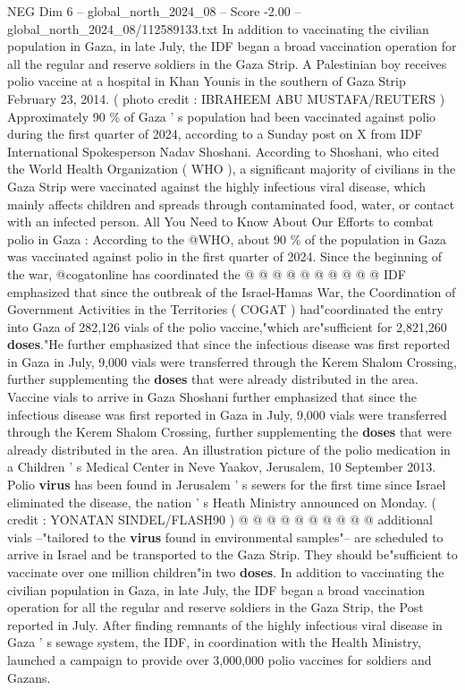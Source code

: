 \begin{textsample}{NEG Dim 6 – global\_north\_2024\_08 – Score -2.00 – global\_north\_2024\_08/112589133.txt}  \label{ex:f6_neg_066}
In addition to vaccinating the civilian population in Gaza, in late July, the IDF began a broad vaccination operation for all the regular and reserve soldiers in the Gaza Strip.
A Palestinian boy receives polio vaccine at a hospital in Khan Younis in the southern of Gaza Strip February 23, 2014. ( photo credit : IBRAHEEM ABU MUSTAFA/REUTERS ) Approximately 90 \% of Gaza ' s population had been vaccinated against polio during the first quarter of 2024, according to a Sunday post on X from IDF International Spokesperson Nadav Shoshani.
According to Shoshani, who cited the World Health Organization ( WHO ), a significant majority of civilians in the Gaza Strip were vaccinated against the highly infectious viral disease, which mainly affects children and spreads through contaminated food, water, or contact with an infected person.
All You Need to Know About Our Efforts to combat polio in Gaza : According to the @WHO, about 90 \% of the population in Gaza was vaccinated against polio in the first quarter of 2024.
Since the beginning of the war, @cogatonline has coordinated the @ @ @ @ @ @ @ @ @ @ IDF emphasized that since the outbreak of the Israel-Hamas War, the Coordination of Government Activities in the Territories ( COGAT ) had"coordinated the entry into Gaza of 282,126 vials of the polio vaccine,"which are"sufficient for 2,821,260 \textbf{doses}."He further emphasized that since the infectious disease was first reported in Gaza in July, 9,000 vials were transferred through the Kerem Shalom Crossing, further supplementing the \textbf{doses} that were already distributed in the area.
Vaccine vials to arrive in Gaza Shoshani further emphasized that since the infectious disease was first reported in Gaza in July, 9,000 vials were transferred through the Kerem Shalom Crossing, further supplementing the \textbf{doses} that were already distributed in the area.
An illustration picture of the polio medication in a Children ' s Medical Center in Neve Yaakov, Jerusalem, 10 September 2013.
Polio \textbf{virus} has been found in Jerusalem ' s sewers for the first time since Israel eliminated the disease, the nation ' s Heath Ministry announced on Monday. ( credit : YONATAN SINDEL/FLASH90 ) @ @ @ @ @ @ @ @ @ @ additional vials --"tailored to the \textbf{virus} found in environmental samples"-- are scheduled to arrive in Israel and be transported to the Gaza Strip.
They should be"sufficient to vaccinate over one million children"in two \textbf{doses}.
In addition to vaccinating the civilian population in Gaza, in late July, the IDF began a broad vaccination operation for all the regular and reserve soldiers in the Gaza Strip, the Post reported in July.
After finding remnants of the highly infectious viral disease in Gaza ' s sewage system, the IDF, in coordination with the Health Ministry, launched a campaign to provide over 3,000,000 polio vaccines for soldiers and Gazans.

\end{textsample}
